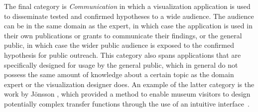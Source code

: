 The final category is \emph{Communication} in which a visualization application is used to disseminate tested and confirmed hypotheses to a wide audience.  The audience can be in the same domain as the expert, in which case the application is used in their own publications or grants to communicate their findings, or the general public, in which case the wider public audience is exposed to the confirmed hypothesis for public outreach.  This category also spans applications that are specifically designed for usage by the general public, which in general do not possess the same amount of knowledge about a certain topic as the domain expert or the visualization designer does.  An example of the latter category is the work by J\"onsson \etal , which provided a method to enable museum visitors to design potentially complex transfer functions through the use of an intuitive interface~\cite{jonsson2016intuitive}.
